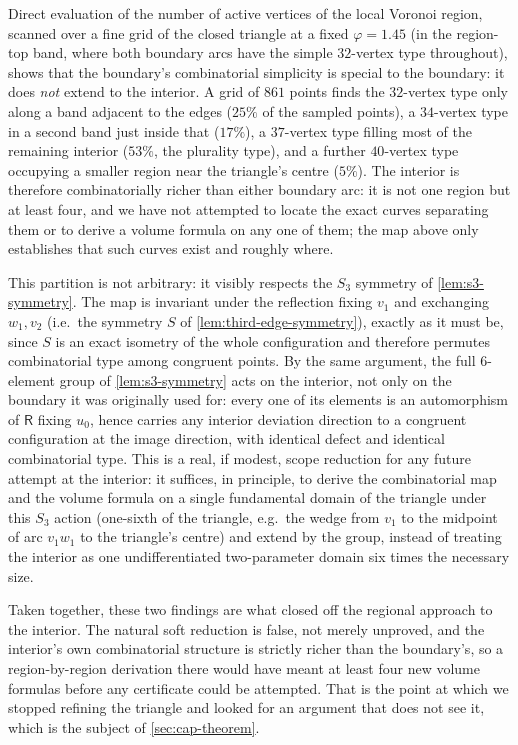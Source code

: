 \documentclass[11pt,reqno]{amsart}
\renewcommand{\_}{\origunderscore\allowbreak}
\numberwithin{equation}{section}
\theoremstyle{plain}
\theoremstyle{definition}
\theoremstyle{remark}
\newcommand{\Rt}{\mathsf{R}}                 %
\newcommand{\tilt}{\varphi}                  %
\begin{document}
Direct evaluation of the number of active vertices of the local Voronoi
region, scanned over a fine grid of the closed triangle at a fixed
$\tilt=1.45$ (in the region-top band, where both boundary arcs have the
simple $32$-vertex type throughout), shows that the boundary's
combinatorial simplicity is special to the boundary: it does \emph{not}
extend to the interior. A grid of $861$ points finds the $32$-vertex
type only along a band adjacent to the edges ($25\%$ of the sampled
points), a $34$-vertex type in a second band just inside that
($17\%$), a $37$-vertex type filling most of the remaining interior
($53\%$, the plurality type), and a further $40$-vertex type occupying a
smaller region near the triangle's centre ($5\%$). The interior is
therefore combinatorially richer than either boundary arc: it is not
one region but at least four, and we have not attempted to locate the
exact curves separating them or to derive a volume formula on any one of
them; the map above only establishes that such curves exist and roughly
where.

This partition is not arbitrary: it visibly respects the $S_3$ symmetry
of \cref{lem:s3-symmetry}. The map is invariant under the reflection
fixing $v_1$ and exchanging $w_1,v_2$ (i.e.\ the symmetry $S$ of
\cref{lem:third-edge-symmetry}), exactly as it must be, since $S$ is an
exact isometry of the whole configuration and therefore permutes
combinatorial type among congruent points. By the same argument, the
full $6$-element group of \cref{lem:s3-symmetry} acts on the interior,
not only on the boundary it was originally used for: every one of its
elements is an automorphism of $\Rt$ fixing $u_0$, hence carries any
interior deviation direction to a congruent configuration at the image
direction, with identical defect and identical combinatorial type. This
is a real, if modest, scope reduction for any future attempt at the
interior: it suffices, in principle, to derive the combinatorial map and
the volume formula on a single fundamental domain of the triangle under
this $S_3$ action (one-sixth of the triangle, e.g.\ the wedge from
$v_1$ to the midpoint of arc $v_1w_1$ to the triangle's centre) and extend by the group, instead of treating the interior as one
undifferentiated two-parameter domain six times the necessary size.

Taken together, these two findings are what closed off the regional
approach to the interior. The natural soft reduction is false, not
merely unproved, and the interior's own combinatorial structure is
strictly richer than the boundary's, so a region-by-region derivation
there would have meant at least four new volume formulas before any
certificate could be attempted. That is the point at which we stopped
refining the triangle and looked for an argument that does not see it,
which is the subject of \cref{sec:cap-theorem}.
\end{document}
